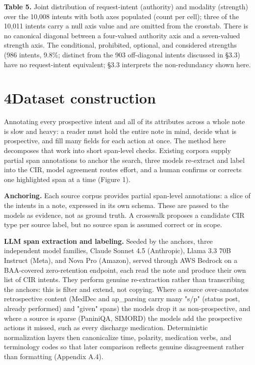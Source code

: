\textbf{Table 5.} Joint distribution of request-intent (authority) and modality (strength) over the 10,008 intents with both axes populated (count per cell); three of the 10,011 intents carry a null axis value and are omitted from the crosstab. There is no canonical diagonal between a four-valued authority axis and a seven-valued strength axis. The conditional, prohibited, optional, and considered strengths (986 intents, 9.8\%; distinct from the 903 off-diagonal intents discussed in §3.3) have no request-intent equivalent; §3.3 interprets the non-redundancy shown here.

\section{\texorpdfstring{{4}Dataset construction}{4Dataset construction}}\label{dataset-construction}

Annotating every prospective intent and all of its attributes across a whole note is slow and heavy: a reader must hold the entire note in mind, decide what is prospective, and fill many fields for each action at once. The method here decomposes that work into short span-level checks. Existing corpora supply partial span annotations to anchor the search, three models re-extract and label into the CIR, model agreement routes effort, and a human confirms or corrects one highlighted span at a time (Figure 1).

\textbf{Anchoring.} Each source corpus provides partial span-level annotations: a slice of the intents in a note, expressed in its own schema. These are passed to the models as evidence, not as ground truth. A crosswalk proposes a candidate CIR type per source label, but no source span is assumed correct or in scope.

\textbf{LLM span extraction and labeling.} Seeded by the anchors, three independent model families, Claude Sonnet 4.5 (Anthropic), Llama 3.3 70B Instruct (Meta), and Nova Pro (Amazon), served through AWS Bedrock on a BAA-covered zero-retention endpoint, each read the note and produce their own list of CIR intents. They perform genuine re-extraction rather than transcribing the anchors: this is filter and extend, not copying. Where a source over-annotates retrospective content (MedDec and ap\_parsing carry many "s/p" (status post, already performed) and "given" spans) the models drop it as non-prospective, and where a source is sparse (PaniniQA, SIMORD) the models add the prospective actions it missed, such as every discharge medication. Deterministic normalization layers then canonicalize time, polarity, medication verbs, and terminology codes so that later comparison reflects genuine disagreement rather than formatting (Appendix A.4).

